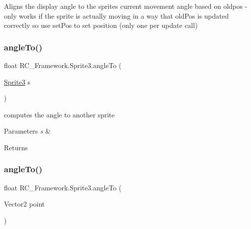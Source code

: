 Aligns the display angle to the sprites current movement angle based on oldpos -\/ only works if the sprite is actually moving in a way that old\+Pos is updated correctly so use set\+Pos to set position (only one per update call) 

\mbox{\label{class_r_c___framework_1_1_sprite3_a5354cb9f7ec64fa47814f67ee05d5fa5}} 
\subsubsection{\texorpdfstring{angle\+To()}{angleTo()}\hspace{0.1cm}{\footnotesize\ttfamily [1/2]}}
{\footnotesize\ttfamily float R\+C\+\_\+\+Framework.\+Sprite3.\+angle\+To (\begin{DoxyParamCaption}\item[{\mbox{\hyperlink{class_r_c___framework_1_1_sprite3}{Sprite3}}}]{s }\end{DoxyParamCaption})}



computes the angle to another sprite 


\begin{DoxyParams}{Parameters}
{\em s} & \\
\hline
\end{DoxyParams}
\begin{DoxyReturn}{Returns}

\end{DoxyReturn}
\mbox{\label{class_r_c___framework_1_1_sprite3_a61485db626575e2a63c7ba078f84d46d}} 
\subsubsection{\texorpdfstring{angle\+To()}{angleTo()}\hspace{0.1cm}{\footnotesize\ttfamily [2/2]}}
{\footnotesize\ttfamily float R\+C\+\_\+\+Framework.\+Sprite3.\+angle\+To (\begin{DoxyParamCaption}\item[{Vector2}]{point }\end{DoxyParamCaption})}



